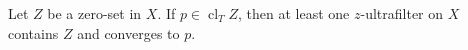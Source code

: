 Let $Z$ be a zero-set in $X$. If $p \in \operatorname{cl}_T Z$, then at least one $z$-ultrafilter on $X$ contains $Z$ and converges to $p$.
